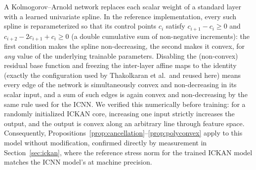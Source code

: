 \documentclass[10pt,a4paper]{article}
\begin{document}
A Kolmogorov--Arnold network replaces each scalar weight of a standard
layer with a learned univariate spline. In the reference implementation,
every such spline is reparameterized so that its control points $c_i$
satisfy $c_{i+1}-c_i\geq0$ and $c_{i+2}-2c_{i+1}+c_i\geq0$ (a double
cumulative sum of non-negative increments): the first condition makes
the spline non-decreasing, the second makes it convex, for \emph{any}
value of the underlying trainable parameters. Disabling the
(non-convex) residual base function and freezing the inter-layer affine
maps to the identity (exactly the configuration used by Thakolkaran
et al.\ and reused here) means every edge of the network is
simultaneously convex and non-decreasing in its scalar input, and a sum
of such edges is again convex and non-decreasing by the same rule used
for the ICNN. We verified this numerically before training: for a
randomly initialized ICKAN core, increasing one input strictly
increases the output, and the output is convex along an arbitrary line
through feature space. Consequently,
Propositions~\ref{prop:cancellation}--\ref{prop:polyconvex} apply to
this model without modification, confirmed directly by measurement in
Section~\ref{sec:ickan}, where the reference stress norm for the
trained ICKAN model matches the ICNN model's at machine precision.
\end{document}
